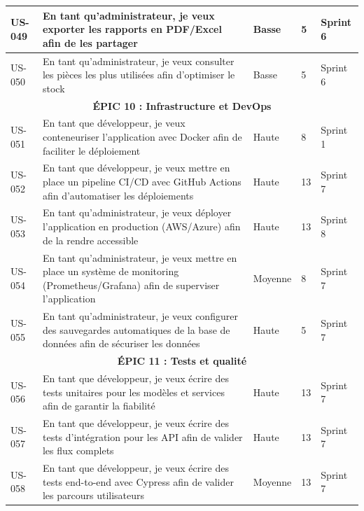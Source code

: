 \begin{longtable}{|p{1cm}|p{5.5cm}|p{1.8cm}|p{1.5cm}|p{1.5cm}|}
US-049 & En tant qu'administrateur, je veux exporter les rapports en PDF/Excel afin de les partager & Basse & 5 & Sprint 6 \\
\hline

US-050 & En tant qu'administrateur, je veux consulter les pièces les plus utilisées afin d'optimiser le stock & Basse & 5 & Sprint 6 \\
\hline

\multicolumn{5}{|c|}{\cellcolor{gray!20}\textbf{ÉPIC 10 : Infrastructure et DevOps}} \\
\hline

US-051 & En tant que développeur, je veux conteneuriser l'application avec Docker afin de faciliter le déploiement & Haute & 8 & Sprint 1 \\
\hline

US-052 & En tant que développeur, je veux mettre en place un pipeline CI/CD avec GitHub Actions afin d'automatiser les déploiements & Haute & 13 & Sprint 7 \\
\hline

US-053 & En tant qu'administrateur, je veux déployer l'application en production (AWS/Azure) afin de la rendre accessible & Haute & 13 & Sprint 8 \\
\hline

US-054 & En tant qu'administrateur, je veux mettre en place un système de monitoring (Prometheus/Grafana) afin de superviser l'application & Moyenne & 8 & Sprint 7 \\
\hline

US-055 & En tant qu'administrateur, je veux configurer des sauvegardes automatiques de la base de données afin de sécuriser les données & Haute & 5 & Sprint 7 \\
\hline

\multicolumn{5}{|c|}{\cellcolor{gray!20}\textbf{ÉPIC 11 : Tests et qualité}} \\
\hline

US-056 & En tant que développeur, je veux écrire des tests unitaires pour les modèles et services afin de garantir la fiabilité & Haute & 13 & Sprint 7 \\
\hline

US-057 & En tant que développeur, je veux écrire des tests d'intégration pour les API afin de valider les flux complets & Haute & 13 & Sprint 7 \\
\hline

US-058 & En tant que développeur, je veux écrire des tests end-to-end avec Cypress afin de valider les parcours utilisateurs & Moyenne & 13 & Sprint 7 \\
\hline


\end{longtable}

